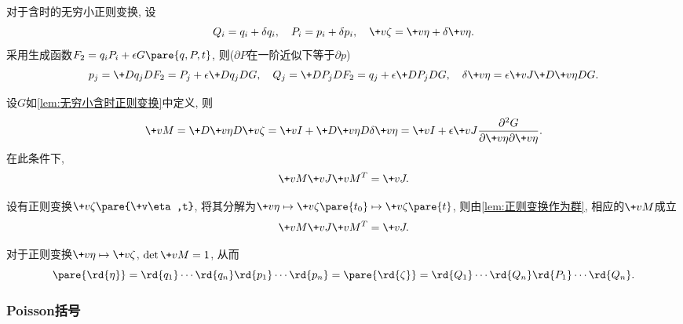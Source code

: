 \documentclass[../TheoreticalMechanics.tex]{subfiles}
\begin{document}
\begin{lemma}[无穷小含时正则变换]
    \label{lem:无穷小含时正则变换}
    对于含时的无穷小正则变换, 设
    \[ Q_i = q_i + \delta q_i,\quad P_i = p_i + \delta p_i,\quad \+v\zeta = \+v\eta + \delta\+v\eta. \]
    采用生成函数$F_2 = q_iP_i + \epsilon G\pare{q,P,t}$, 则($\partial P$在一阶近似下等于$\partial p$)
    \[ p_j = \+D{q_j}D{F_2} = P_j + \epsilon \+D{q_j}DG,\quad Q_j = \+D{P_j}D{F_2} = q_j + \epsilon \+D{P_j}DG,\quad \delta\+v\eta = \epsilon\+vJ\+D{\+v\eta}DG. \]
\end{lemma}
\begin{lemma}[无穷小含时正则变换条件]
    设$G$如\cref{lem:无穷小含时正则变换}中定义, 则
    \[ \+vM = \+D{\+v\eta}D{\+v\zeta} = \+vI + \+D{\+v\eta}D{\delta\+v\eta} = \+vI + \epsilon \+vJ \frac{\partial^2 G}{\partial\+v\eta\partial\+v\eta}. \]
    在此条件下,
    \[ \+vM\+vJ\+vM^T = \+vJ. \]
\end{lemma}
\begin{finale}
    \begin{theorem}[正则变换条件的辛表述]
        设有正则变换$\+v\zeta\pare{\+v\eta,t}$, 将其分解为$\+v\eta\mapsto\+v\zeta\pare{t_0}\mapsto\+v\zeta\pare{t}$, 则由\cref{lem:正则变换作为群}, 相应的$\+vM$成立
        \[ \+vM \+vJ \+vM^T = \+vJ. \]
    \end{theorem}
\end{finale}
\begin{theorem}[正则坐标的体积微元作为不变量]
    \label{thm:正则坐标的体积微元作为不变量}
    对于正则变换$\+v\eta\mapsto\+v\zeta$, $\det\+vM = 1$, 从而
    \[ \pare{\rd{\eta}} = \rd{q_1}\cdots\rd{q_n}\rd{p_1}\cdots\rd{p_n} = \pare{\rd{\zeta}} = \rd{Q_1}\cdots\rd{Q_n}\rd{P_1}\cdots\rd{Q_n}. \]
\end{theorem}


\subsubsection{Poisson括号} %
\label{ssub:poisson括号}
\end{document}
